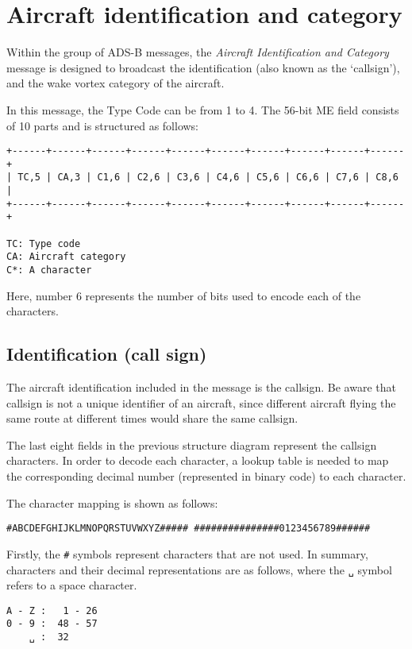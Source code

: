 \chapter{Aircraft identification and category}

Within the group of ADS-B messages, the \emph{Aircraft Identification and Category} message is designed to broadcast the identification (also known as the `callsign'), and the wake vortex category of the aircraft.

In this message, the Type Code can be from 1 to 4. The 56-bit ME field consists of 10 parts and is structured as follows:

\begin{verbatim}
+------+------+------+------+------+------+------+------+------+------+
| TC,5 | CA,3 | C1,6 | C2,6 | C3,6 | C4,6 | C5,6 | C6,6 | C7,6 | C8,6 |
+------+------+------+------+------+------+------+------+------+------+

TC: Type code
CA: Aircraft category
C*: A character
\end{verbatim}

Here, number 6 represents the number of bits used to encode each of the characters.

\section{Identification (call sign)}
The aircraft identification included in the message is the callsign. Be aware that callsign is not a unique identifier of an aircraft, since different aircraft flying the same route at different times would share the same callsign.

The last eight fields in the previous structure diagram represent the callsign characters. In order to decode each character, a lookup table is needed to map the corresponding decimal number (represented in binary code) to each character.

The character mapping is shown as follows:

\begin{verbatim}
#ABCDEFGHIJKLMNOPQRSTUVWXYZ##### ###############0123456789######
\end{verbatim}

Firstly, the \texttt{\#} symbols represent characters that are not used. In summary, characters and their decimal representations are as follows, where the \texttt{␣} symbol refers to a space character. 

\begin{verbatim}
A - Z :   1 - 26
0 - 9 :  48 - 57
    ␣ :  32
\end{verbatim}


